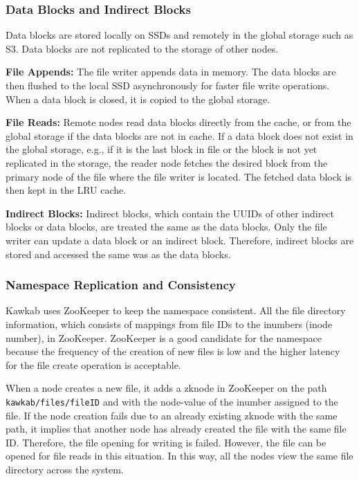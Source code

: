 \documentclass[]{article}
\newcommand{\subtopic}[1]{\vspace{1.5pt} \noindent \textbf{#1}}
\begin{document}
\subsubsection{Data Blocks and Indirect Blocks} Data blocks are stored locally
on SSDs and remotely in the global storage such as S3. Data blocks are
not replicated to the storage of other nodes.

\subtopic{File Appends:} The file writer appends data in memory. The data
blocks are then flushed to the local SSD asynchronously for faster file write
operations. When a data block is closed, it is copied to the global storage.

\subtopic{File Reads:} Remote nodes read data blocks directly from the cache,
or from the global storage if the data blocks are not in cache.  If a
data block does not exist in the global storage, e.g., if it is the last block
in file or the block is not yet replicated in the storage, the reader
node fetches the desired block from the primary node of the file where the file
writer is located. The fetched data block is then kept in the LRU cache.

\subtopic{Indirect Blocks:} Indirect blocks, which contain the UUIDs of other
indirect blocks or data blocks, are treated the same as the data blocks.
Only the file writer can update a data block or an indirect block. Therefore,
indirect blocks are stored and accessed the same was as the data blocks.


\subsubsection{Namespace Replication and Consistency}
Kawkab uses ZooKeeper to keep the namespace consistent. All the file
directory information, which consists of mappings from file IDs to the
inumbers (inode number), in ZooKeeper. ZooKeeper is a good candidate
for the namespace because the frequency of the creation of new files is low
and the higher latency for the file create operation is acceptable.

When a node creates a new file, it adds a zknode in ZooKeeper on the path
\texttt{kawkab/files/fileID} and with the node-value of the inumber assigned to
the file. If the node creation fails due to an already existing zknode with
the same path, it implies that another node has already created the file with the same
file ID. Therefore, the file opening for writing is failed. However, the file can be
opened for file reads in this situation. In this way, all the nodes view
the same file directory across the system.
\end{document}
